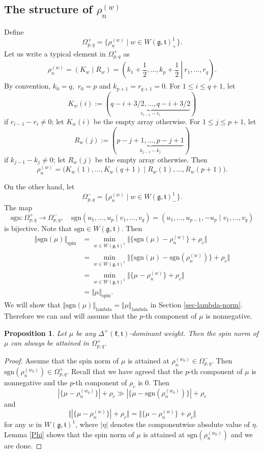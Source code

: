 \documentclass[11pt]{amsart}
\theoremstyle{plain}
\newtheorem{prop}[thm]{Proposition}
\theoremstyle{definition}
\newcommand{\frg}{\mathfrak{g}}
\newcommand{\mfg}{\mathfrak{g}}
\newcommand{\mfk}{\mathfrak{k}}
\newcommand{\frt}{\mathfrak{t}}
\newcommand{\mft}{\mathfrak{t}}
\begin{document}
\subsection{The structure of $\rho_n^{(w)}$}
Define
\[\Omega_{p,q}^+=\{\rho_n^{(w)}\mid w\in W(\frg,\frt)^1_+\}.\]
Let us write a typical element in $\Omega_{p,q}^+$ as
\begin{equation}\label{rho-n-w}
\rho_n^{(w)}=(K_w\mid R_w)=\left.\left(k_1+\frac{1}{2},\dots,k_p+\frac{1}{2}\ \right|\ r_1,\dots,r_q\right).
\end{equation}
By convention, $k_0=q$,\ $r_0=p$ and $k_{p+1}=r_{q+1}=0$. For $1\le i\le q+1$, let
\[K_w(i):=(\underbrace{q-i+3/2,\dots,q-i+3/2}_{r_{i-1}-r_i})\]
if $r_{i-1}-r_i\neq 0$; let $K_w(i)$ be the empty array otherwise. For $1\le j\le p+1$, let
\[R_w(j):=(\underbrace{p-j+1,\dots,p-j+1}_{k_{j-1}-k_j})\]
if $k_{j-1}-k_j\neq 0$; let $R_w(j)$ be the empty array otherwise. Then
\[\rho_n^{(w)}=\big(K_w(1),\dots,K_w(q+1)\mid R_w(1),\dots,R_w(p+1)\big).\]

On the other hand, let
\[\Omega_{p,q}^-=\{\rho_n^{(w)}\mid w\in W(\mfg,\mft)^1_-\}.\]
The map
\[\mathrm{sgn}:\Omega_{p,q}^+\to \Omega_{p,q}^-,\quad \mathrm{sgn}(u_1,\dots,u_p\mid v_1,\dots,v_q)= (u_1,\dots,u_{p-1},-u_p\mid v_1,\dots,v_q)\]
is bijective. Note that $\mathrm{sgn}\in W(\mfg,\mft)$. Then
	\begin{align*}
	\Vert \mathrm{sgn}(\mu)\Vert_{\mathrm{spin}}&=\min_{w\in W(\mfg,\mft)^1}\Vert \{\mathrm{sgn}(\mu)-\rho_n^{(w)}\}+\rho_c\Vert\\
	&=\min_{w\in W(\mfg,\mft)^1}\Vert \{\mathrm{sgn}(\mu)-\mathrm{sgn}(\rho_n^{(w)})\}+\rho_c\Vert\\
	&=\min_{w\in W(\mfg,\mft)^1}\Vert \{\mu-\rho_n^{(w)}\}+\rho_c\Vert\\
	&=\Vert\mu\Vert_{\mathrm{spin}}.
\end{align*}
We will show that $\Vert\mathrm{sgn}(\mu)\Vert_{\mathrm{lambda}}=\Vert\mu\Vert_{\mathrm{lambda}}$ in Section \ref{sec-lambda-norm}. Therefore we can and will assume that the $p$-th component of $\mu$ is nonnegative.

\begin{prop}
	Let $\mu$ be any $\Delta^+(\mfk,\mft)$-dominant weight. Then the spin norm of $\mu$ can always be attained in $\Omega_{p,q}^+$.
\end{prop}
\begin{proof}
	Assume that the spin norm of $\mu$ is attained at $\rho_n^{(w_0)}\in \Omega_{p,q}^-$. Then $\mathrm{sgn}(\rho_n^{(w_0)})\in \Omega_{p,q}^+$. Recall that we have agreed that the $p$-th component of $\mu$ is nonnegative and the $p$-th component of $\rho_c$ is $0$. Then
	\[|\{\mu-\rho_n^{(w_0)}\}|+\rho_c\gg |\{\mu-\mathrm{sgn}(\rho_n^{(w_0)})\}|+\rho_c\]
	and
	\[\Vert|\{\mu-\rho_n^{(w)}\}|+\rho_c\Vert=\Vert\{\mu-\rho_n^{(w)}\}+\rho_c\Vert\]
	for any $w$ in $W(\mfg,\mft)^1$, where $|\eta|$ denotes the componentwise absolute value of $\eta$.  Lemma \ref{Phi} shows that the spin norm of $\mu$ is attained at $\mathrm{sgn}(\rho_n^{(w_0)})$ and we are done.
\end{proof}
\end{document}
